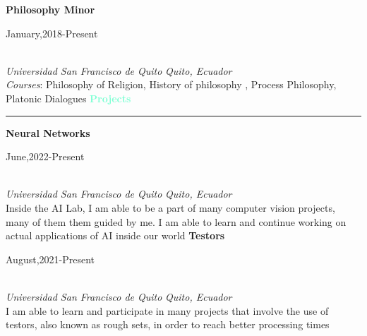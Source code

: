 \documentclass[12pt]{article}
\newenvironment{til}[2]
{
  \large
  \textcolor{Aquamarine}{\textbf{#1}}
  \vspace{0.05in}
  \textcolor{Aquamarine}{\hrule}
}{
  \vspace{0.05in}
}
\newenvironment{itemexp}[5]{
  \textbf{#1} \hfill \begin{scriptsize}#2\end{scriptsize}\\
  \scriptsize\textit{#3} \hfill \textit{#4}\\\normalsize
  \footnotesize #5}{\smallbreak}
\begin{document}
\begin{minipage}[t]{0.61\textwidth}
\begin{itemexp}
    {Philosophy Minor}{January,2018-Present}{Universidad
    San Francisco de Quito}{Quito, Ecuador}
    {\textit{Courses}: Philosophy of Religion, History of philosophy , Process
      Philosophy, Platonic Dialogues}
  \end{itemexp}
  \smallbreak
  \begin{til}{Projects}{1}
  \end{til}
  \begin{itemexp}
    {Neural Networks}{June,2022-Present}{Universidad
    San Francisco de Quito}{Quito, Ecuador}
    {Inside the AI Lab, I am able to be a part of many computer vision projects,
    many of them them guided by me. I am able to learn and continue working on
    actual applications of AI inside our world }
  \end{itemexp}
  \begin{itemexp}
    {Testors}{August,2021-Present}{Universidad
    San Francisco de Quito}{Quito, Ecuador}
    {I am able to learn and participate in many projects that involve the use of
    testors, also known as rough sets, in order to reach better processing times}
  \end{itemexp}
\end{minipage}
\end{document}
